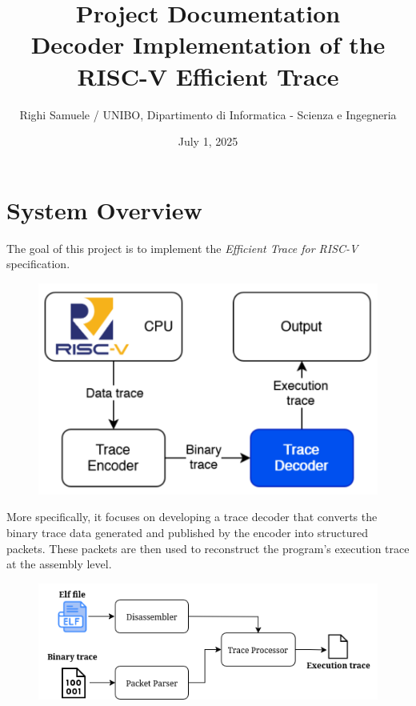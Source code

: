 \documentclass[a4paper,12pt]{article}
\title{Project Documentation \\ Decoder Implementation of the RISC-V Efficient Trace}
\author{Righi Samuele / UNIBO, Dipartimento di Informatica - Scienza e Ingegneria }
\date{July 1, 2025}
\begin{document}
\maketitle
\tableofcontents
\newpage


\section{System Overview}
The goal of this project \cite{trace_decoder} is to implement the \textit{Efficient Trace for RISC-V}\cite{riscv_trace_spec} specification. 

\begin{figure}[h]
    \centering
    \includegraphics[width=0.6\linewidth]{img/tracing_diagram.png}
\end{figure}


More specifically, it focuses on developing a trace decoder that converts the binary trace data generated and published by the encoder into structured packets. These packets are then used to reconstruct the program’s execution trace at the assembly level.

\begin{figure}[h]
    \centering
    \includegraphics[width=0.8\linewidth]{img/trace_processing_flow.png}
\end{figure}
\end{document}
